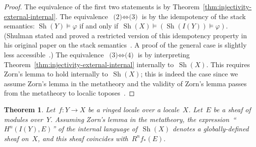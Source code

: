 \documentclass[oneside]{amsart}
\theoremstyle{definition}
\theoremstyle{plain}
\newtheorem{thm}[defn]{Theorem}
\theoremstyle{remark}
\DeclareMathOperator{\Sh}{Sh}
\renewcommand{\_}{\mathpunct{.}\,}
\begin{document}
\begin{proof}The equivalence of the first two statements is by
Theorem~\ref{thm:injectivity-external-internal}. The equivalence~$\text{(2)}
\Leftrightarrow \text{(3)}$ is by the idempotency of the stack semantics:
$\Sh(Y) \models \varphi$ if and only if~$\Sh(X) \models (\Sh(I(Y)) \models
\varphi)$. (Shulman stated and proved a restricted version of this idempotency property
in his original paper on the stack semantics~\cite[Lemma~7.20]{shulman:stack-semantics}.
A proof of the general case is slightly less
accessible~\cite[Lemma~1.20]{blechschmidt:master}.) The equivalence~$\text{(3)}
\Leftrightarrow \text{(4)}$ is by interpreting
Theorem~\ref{thm:injectivity-external-internal} internally to~$\Sh(X)$. This
requires Zorn's lemma to hold internally to~$\Sh(X)$; this is indeed the case
since we assume Zorn's lemma in the metatheory and the validity of Zorn's
lemma passes from the metatheory to localic
toposes~\cite[Proposition~D4.5.14]{johnstone:elephant}.
\end{proof}

\begin{thm}\label{thm:higher-direct-images-as-internal-sheaf-cohomology}
Let~$f : Y \to X$ be a ringed locale over a locale~$X$. Let~$E$ be a sheaf of modules over~$Y$.
Assuming Zorn's lemma in the metatheory, the expression~``$H^n(I(Y), E)$''
of the internal language of~$\Sh(X)$ denotes a globally-defined sheaf
on~$X$, and this sheaf coincides with~$R^n f_*(E)$.\end{thm}
\end{document}

